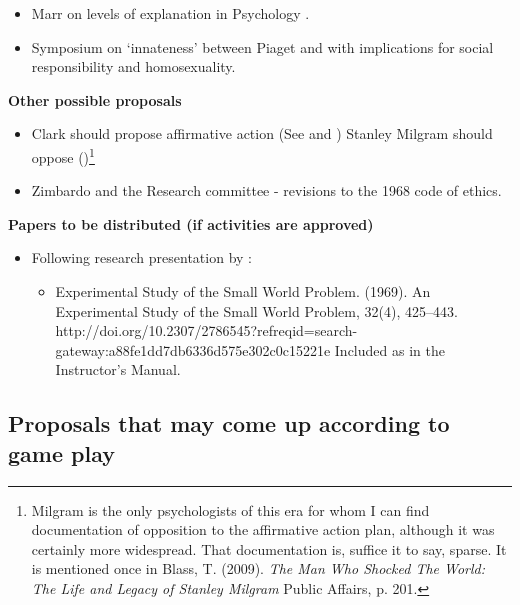 \begin{refsection}
\begin{itemize}
\item Marr on levels of explanation in Psychology .

\item Symposium on ‘innateness’ between Piaget  and   with implications for social responsibility and homosexuality.

\end{itemize}

\textbf{Other possible proposals}

\begin{itemize}
\item Clark should propose affirmative action (See  and ) Stanley Milgram should oppose ()\footnote{Milgram is the only psychologists of this era for whom I can find documentation of opposition to the affirmative action plan, although it was certainly more widespread. That documentation is, suffice it to say, sparse. It is mentioned once in Blass, T. (2009). \emph{The Man Who Shocked The World: The Life and Legacy of Stanley Milgram} Public Affairs, p. 201.}

\item Zimbardo and the Research committee - revisions to the 1968 code of ethics.

\end{itemize}

\textbf{Papers to be distributed (if activities are approved)}

\begin{itemize}
\item Following research presentation by :

\begin{itemize}
\item Experimental Study of the Small World Problem. (1969). An Experimental Study of the Small World Problem, 32(4), 425–443. http:\slash \slash doi.org\slash 10.2307\slash 2786545?refreqid=search-gateway:a88fe1dd7db6336d575e302c0c15221e Included as  in the Instructor's Manual.

\end{itemize}

\end{itemize}

\newpage

\subsection{Proposals that may come up according to game play}
\label{proposalsthatmaycomeupaccordingtogameplay}


\end{refsection}
